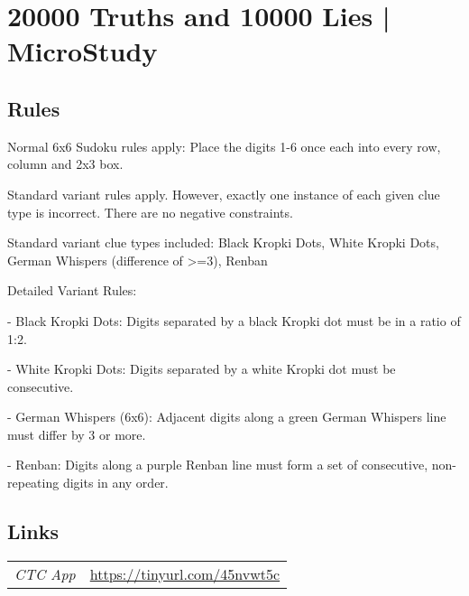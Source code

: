 \section[20000 Truths and 10000 Lies | MicroStudy {[\emph{Sudoku, Liar Clues, German Whispers, Renban, Kropki Pairs}]}]{20000 Truths and 10000 Lies | {\normalfont MicroStudy}}
\label{sec:41-20000-truths-and-10000-lies-microstudy}

\subsection*{Rules}
\begin{markdown}
Normal 6x6 Sudoku rules apply: Place the digits 1-6 once each into every row, column and 2x3 box.



Standard variant rules apply. However, exactly one instance of each given clue type is incorrect. There are no negative constraints.



Standard variant clue types included: Black Kropki Dots, White Kropki Dots, German Whispers (difference of >=3), Renban



Detailed Variant Rules:

- Black Kropki Dots: Digits separated by a black Kropki dot must be in a ratio of 1:2.

- White Kropki Dots: Digits separated by a white Kropki dot must be consecutive.

- German Whispers (6x6): Adjacent digits along a green German Whispers line must differ by 3 or more.

- Renban: Digits along a purple Renban line must form a set of consecutive, non-repeating digits in any order.
\end{markdown}
\subsection*{Links}
\begin{tabularx}{\textwidth}{l X}
\emph{CTC App} & \url{https://tinyurl.com/45nvwt5c} \\
\end{tabularx}
\pagebreak
